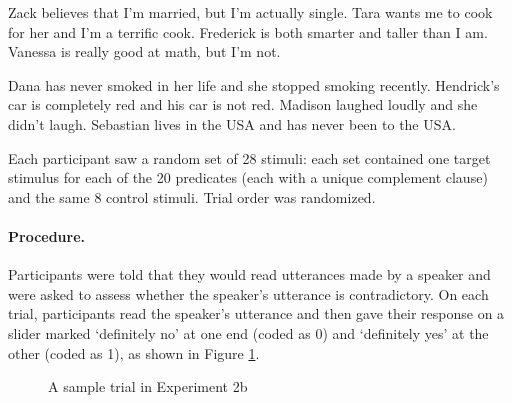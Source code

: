 \documentclass[11pt,fleqn]{article}
\newcommand{\6}{\mbox{$[\hspace*{-.6mm}[$}}
\newcommand{\9}{\mbox{$]\hspace*{-.6mm}]$}}
\begin{document}
{\begin{exe}
\ex\label{control-good}
\begin{xlist}
\ex Zack believes that I'm married, but I'm actually single.
\ex Tara wants me to cook for her and I'm a terrific cook.
\ex Frederick is both smarter and taller than I am.
\ex Vanessa is really good at math, but I'm not.
\end{xlist}
\ex\label{control-bad}
\begin{xlist}
\ex Dana has never smoked in her life and she stopped smoking recently.
\ex Hendrick's car is completely red and his car is not red.
\ex Madison laughed loudly and she didn't laugh.
\ex Sebastian lives in the USA and has never been to the USA.
\end{xlist}
\end{exe}

Each participant saw a random set of 28 stimuli: each set contained one target stimulus for each of the 20 predicates (each with a unique complement clause) and the same 8 control stimuli. Trial order was randomized.


\paragraph{Procedure.} Participants were told that they would read utterances made by a speaker and were asked to assess whether the speaker's utterance is contradictory. On each trial, participants read the speaker's utterance and then gave their response on a slider marked `definitely no' at one end (coded as 0) and `definitely yes' at the other (coded as 1), as shown in Figure \ref{f-trial-exp2}.

\begin{figure}[h!]
\begin{center}
\end{center}
\caption{A sample trial in Experiment 2b}\label{f-trial-exp2}
\end{figure}

}
\end{document}
